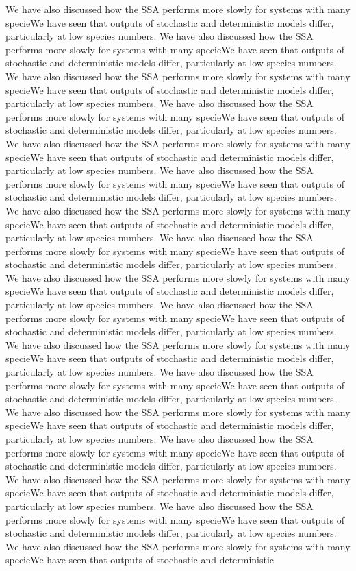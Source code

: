 \documentclass[11pt]{article}
\begin{document}
\begin{multicols}{2}
 We have also discussed how the SSA performs more slowly for systems with many specieWe have seen that outputs of stochastic and deterministic models differ, particularly at low species numbers. We have also discussed how the SSA performs more slowly for systems with many specieWe have seen that outputs of stochastic and deterministic models differ, particularly at low species numbers. We have also discussed how the SSA performs more slowly for systems with many specieWe have seen that outputs of stochastic and deterministic models differ, particularly at low species numbers. We have also discussed how the SSA performs more slowly for systems with many specieWe have seen that outputs of stochastic and deterministic models differ, particularly at low species numbers. We have also discussed how the SSA performs more slowly for systems with many specieWe have seen that outputs of stochastic and deterministic models differ, particularly at low species numbers. We have also discussed how the SSA performs more slowly for systems with many specieWe have seen that outputs of stochastic and deterministic models differ, particularly at low species numbers. We have also discussed how the SSA performs more slowly for systems with many specieWe have seen that outputs of stochastic and deterministic models differ, particularly at low species numbers. We have also discussed how the SSA performs more slowly for systems with many specieWe have seen that outputs of stochastic and deterministic models differ, particularly at low species numbers. We have also discussed how the SSA performs more slowly for systems with many specieWe have seen that outputs of stochastic and deterministic models differ, particularly at low species numbers. We have also discussed how the SSA performs more slowly for systems with many specieWe have seen that outputs of stochastic and deterministic models differ, particularly at low species numbers. We have also discussed how the SSA performs more slowly for systems with many specieWe have seen that outputs of stochastic and deterministic models differ, particularly at low species numbers. We have also discussed how the SSA performs more slowly for systems with many specieWe have seen that outputs of stochastic and deterministic models differ, particularly at low species numbers. We have also discussed how the SSA performs more slowly for systems with many specieWe have seen that outputs of stochastic and deterministic models differ, particularly at low species numbers. We have also discussed how the SSA performs more slowly for systems with many specieWe have seen that outputs of stochastic and deterministic models differ, particularly at low species numbers. We have also discussed how the SSA performs more slowly for systems with many specieWe have seen that outputs of stochastic and deterministic models differ, particularly at low species numbers. We have also discussed how the SSA performs more slowly for systems with many specieWe have seen that outputs of stochastic and deterministic models differ, particularly at low species numbers. We have also discussed how the SSA performs more slowly for systems with many specieWe have seen that outputs of stochastic and deterministic 
\end{multicols}
\end{document}
